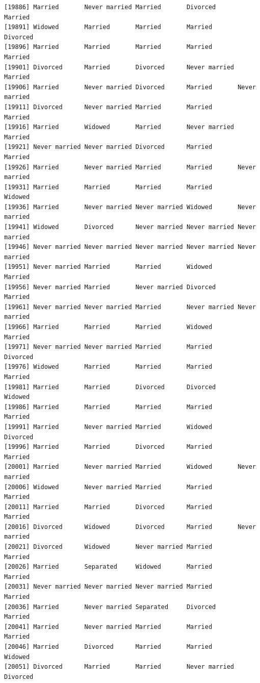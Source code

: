 \documentclass[
  letterpaper,
  DIV=11,
  numbers=noendperiod,
  oneside]{scrartcl}
\begin{document}
\begin{verbatim}
[19886] Married       Never married Married       Divorced      Married      
[19891] Widowed       Married       Married       Married       Divorced     
[19896] Married       Married       Married       Married       Married      
[19901] Divorced      Married       Divorced      Never married Married      
[19906] Married       Never married Divorced      Married       Never married
[19911] Divorced      Never married Married       Married       Married      
[19916] Married       Widowed       Married       Never married Married      
[19921] Never married Never married Divorced      Married       Married      
[19926] Married       Never married Married       Married       Never married
[19931] Married       Married       Married       Married       Widowed      
[19936] Married       Never married Never married Widowed       Never married
[19941] Widowed       Divorced      Never married Never married Never married
[19946] Never married Never married Never married Never married Never married
[19951] Never married Married       Married       Widowed       Married      
[19956] Never married Married       Never married Divorced      Married      
[19961] Never married Never married Married       Never married Never married
[19966] Married       Married       Married       Widowed       Married      
[19971] Never married Never married Married       Married       Divorced     
[19976] Widowed       Married       Married       Married       Married      
[19981] Married       Married       Divorced      Divorced      Widowed      
[19986] Married       Married       Married       Married       Married      
[19991] Married       Never married Married       Widowed       Divorced     
[19996] Married       Married       Divorced      Married       Married      
[20001] Married       Never married Married       Widowed       Never married
[20006] Widowed       Never married Married       Married       Married      
[20011] Married       Married       Divorced      Married       Married      
[20016] Divorced      Widowed       Divorced      Married       Never married
[20021] Divorced      Widowed       Never married Married       Married      
[20026] Married       Separated     Widowed       Married       Married      
[20031] Never married Never married Never married Married       Married      
[20036] Married       Never married Separated     Divorced      Married      
[20041] Married       Never married Married       Married       Married      
[20046] Married       Divorced      Married       Married       Widowed      
[20051] Divorced      Married       Married       Never married Divorced     

\end{verbatim}
\end{document}
